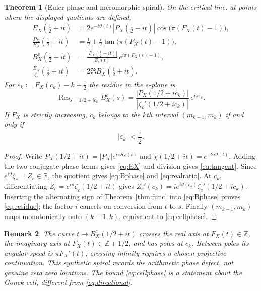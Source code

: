 \documentclass[11pt,a4paper]{article}
\numberwithin{equation}{section}
\newtheorem{theorem}{Theorem}[section]
\newtheorem{remark}[theorem]{Remark}
\newcommand{\R}{\mathbb R}
\newcommand{\Res}{\operatorname{Res}}
\newcommand{\eps}{\varepsilon}
\begin{document}
\begin{theorem}[Euler-phase and meromorphic spiral]\label{thm:spiral}
On the critical line, at points where the displayed quotients are defined,
\begin{align}
E_X(\tfrac12+it)&=2e^{-i\vartheta(t)}|P_X(\tfrac12+it)|\cos\big(\pi(F_X(t)-1)\big),\label{eq:EX}\\
\frac{P_X}{E_X}(\tfrac12+it)&=\frac12+\frac i2\tan\big(\pi(F_X(t)-1)\big),\label{eq:tangent}\\
B_X^c(\tfrac12+it)&=\frac{|P_X(\tfrac12+it)|}{Z_c(t)}\,e^{i\pi(F_X(t)-1)},\label{eq:Bphase}\\
\frac{E_X}{\zeta_c}(\tfrac12+it)&=2\Re B_X^c(\tfrac12+it).
\label{eq:realratio}
\end{align}
For $\eps_k:=F_X(c_k)-k+\tfrac12$ the residue in the \emph{$s$-plane} is
\begin{equation}\label{eq:residue}
\Res_{s=1/2+ic_k}B_X^c(s)=
\frac{|P_X(1/2+ic_k)|}{|\zeta_c'(1/2+ic_k)|}\,e^{i\pi\eps_k}.
\end{equation}
If $F_X$ is strictly increasing, $c_k$ belongs to the $k$th interval $(m_{k-1},m_k)$ if and only if
\begin{equation}\label{eq:cellphase}
|\eps_k|<\frac12.
\end{equation}
\end{theorem}
\begin{proof}
Write $P_X(1/2+it)=|P_X|e^{i\pi S_X(t)}$ and $\chi(1/2+it)=e^{-2i\vartheta(t)}$. Adding the two conjugate-phase terms gives \eqref{eq:EX} and division gives \eqref{eq:tangent}. Since $e^{i\vartheta}\zeta_c=Z_c\in\R$, the quotient gives \eqref{eq:Bphase} and \eqref{eq:realratio}. At $c_k$, differentiating $Z_c=e^{i\vartheta}\zeta_c(1/2+it)$ gives $Z_c'(c_k)=i e^{i\vartheta(c_k)}\zeta_c'(1/2+ic_k)$. Inserting the alternating sign of Theorem~\ref{thm:func} into \eqref{eq:Bphase} proves \eqref{eq:residue}; the factor $i$ cancels on conversion from $t$ to $s$. Finally $(m_{k-1},m_k)$ maps monotonically onto $(k-1,k)$, equivalent to \eqref{eq:cellphase}.
\end{proof}
\begin{remark}
The curve $t\mapsto B_X^c(1/2+it)$ crosses the real axis at $F_X(t)\in\mathbb Z$, the imaginary axis at $F_X(t)\in\mathbb Z+1/2$, and has poles at $c_k$. Between poles its angular speed is $\pi F_X'(t)$; crossing infinity requires a chosen projective continuation. This \emph{synthetic spiral} records the arithmetic phase defect, not genuine zeta zero locations. The bound \eqref{eq:cellphase} is a statement about the \emph{Gonek cell}, different from \eqref{eq:directional}.
\end{remark}
\end{document}

